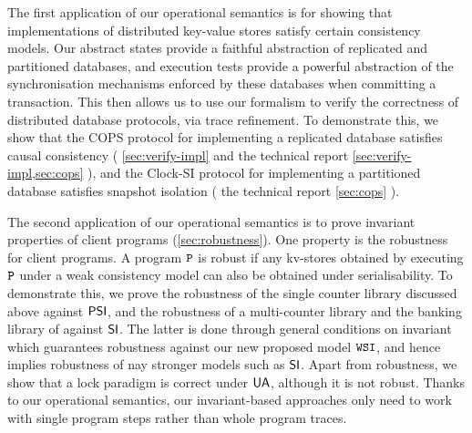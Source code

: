 The first application of our operational
semantics is for showing that implementations of distributed
key-value stores satisfy certain consistency models. 
Our abstract states provide a 
faithful abstraction of replicated and partitioned
databases, and execution tests provide a powerful abstraction of the synchronisation mechanisms 
enforced by these databases when committing a transaction. 
This then allows us to use our 
formalism to verify the correctness of distributed database protocols,
via trace refinement.
To demonstrate this, we show that the
COPS protocol \citep{cops} for implementing a replicated database 
satisfies causal consistency  
(%
\ifTechRepEdits%
\cref{sec:verify-impl} and the technical report%
\else%
\cref{sec:verify-impl,sec:cops}%
\fi%
), 
and the Clock-SI protocol \citep{clocksi} for implementing a
partitioned database satisfies snapshot isolation
(%
\ifTechRepEdits%
the technical report%
\else%
\cref{sec:cops}%
\fi%
). 

The second application of our operational semantics is to prove
invariant properties of client programs (\cref{sec:robustness}).
One property is the robustness for client programs.
A program \(\mathtt{P}\) is robust if any kv-stores obtained 
by executing \(\mathtt{P}\) under a weak consistency model can also be obtained under serialisability.
To demonstrate this, we prove the robustness of the single
counter library discussed above against \(\mathsf{PSI}\), 
and the robustness of a multi-counter library and the banking library of \citet{bank-example-wsi}
against \(\mathsf{SI}\).
The latter is done through general conditions on invariant
which guarantees robustness against our new proposed model \( \mathtt{WSI} \),
and hence implies robustness of nay stronger models such as  \( \mathsf{SI} \).
Apart from robustness,
we show that a lock paradigm is correct under \( \mathsf{UA} \), 
although it is not robust.
Thanks to our operational semantics, 
our invariant-based approaches only need to work with single program steps 
rather than whole program traces.
